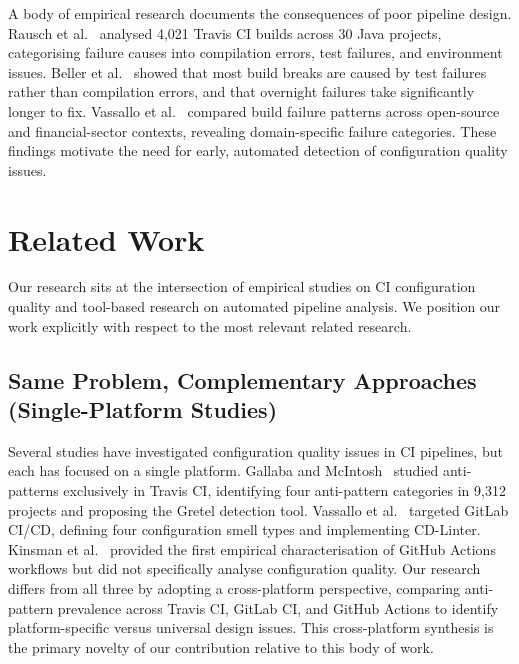 \documentclass[12pt, a4paper]{article}
\begin{document}
A body of empirical research documents the consequences of poor pipeline design.
Rausch et al.~\cite{rausch2017} analysed 4,021 Travis CI builds across 30 Java
projects, categorising failure causes into compilation errors, test failures, and
environment issues. Beller et al.~\cite{beller2017} showed that most build breaks
are caused by test failures rather than compilation errors, and that overnight
failures take significantly longer to fix. Vassallo et al.~\cite{vassallo2017}
compared build failure patterns across open-source and financial-sector contexts,
revealing domain-specific failure categories. These findings motivate the need for
early, automated detection of configuration quality issues.

\section{Related Work}

Our research sits at the intersection of empirical studies on CI configuration quality
and tool-based research on automated pipeline analysis. We position our work explicitly
with respect to the most relevant related research.

\subsection{Same Problem, Complementary Approaches (Single-Platform Studies)}

Several studies have investigated configuration quality issues in CI pipelines, but
each has focused on a single platform. Gallaba and McIntosh~\cite{gallaba2020} studied
anti-patterns exclusively in Travis CI, identifying four anti-pattern categories in
9,312 projects and proposing the Gretel detection tool. Vassallo et al.~\cite{vassallo2020b}
targeted GitLab CI/CD, defining four configuration smell types and implementing
CD-Linter. Kinsman et al.~\cite{kinsman2021} provided the first empirical
characterisation of GitHub Actions workflows but did not specifically analyse
configuration quality. Our research differs from all three by adopting a cross-platform
perspective, comparing anti-pattern prevalence across Travis CI, GitLab CI, and GitHub
Actions to identify platform-specific versus universal design issues. This cross-platform
synthesis is the primary novelty of our contribution relative to this body of work.
\end{document}
